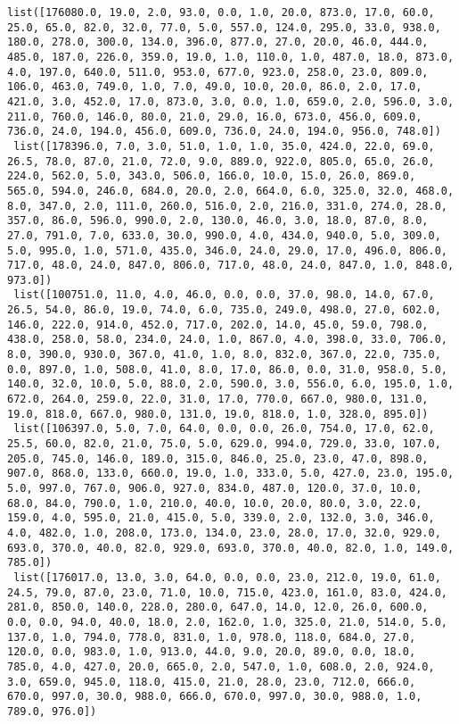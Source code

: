 \documentclass[11pt]{article}
\begin{document}
\begin{Verbatim}[commandchars=\\\{\}]
 list([176080.0, 19.0, 2.0, 93.0, 0.0, 1.0, 20.0, 873.0, 17.0, 60.0, 25.0, 65.0, 82.0, 32.0, 77.0, 5.0, 557.0, 124.0, 295.0, 33.0, 938.0, 180.0, 278.0, 300.0, 134.0, 396.0, 877.0, 27.0, 20.0, 46.0, 444.0, 485.0, 187.0, 226.0, 359.0, 19.0, 1.0, 110.0, 1.0, 487.0, 18.0, 873.0, 4.0, 197.0, 640.0, 511.0, 953.0, 677.0, 923.0, 258.0, 23.0, 809.0, 106.0, 463.0, 749.0, 1.0, 7.0, 49.0, 10.0, 20.0, 86.0, 2.0, 17.0, 421.0, 3.0, 452.0, 17.0, 873.0, 3.0, 0.0, 1.0, 659.0, 2.0, 596.0, 3.0, 211.0, 760.0, 146.0, 80.0, 21.0, 29.0, 16.0, 673.0, 456.0, 609.0, 736.0, 24.0, 194.0, 456.0, 609.0, 736.0, 24.0, 194.0, 956.0, 748.0])
 list([178396.0, 7.0, 3.0, 51.0, 1.0, 1.0, 35.0, 424.0, 22.0, 69.0, 26.5, 78.0, 87.0, 21.0, 72.0, 9.0, 889.0, 922.0, 805.0, 65.0, 26.0, 224.0, 562.0, 5.0, 343.0, 506.0, 166.0, 10.0, 15.0, 26.0, 869.0, 565.0, 594.0, 246.0, 684.0, 20.0, 2.0, 664.0, 6.0, 325.0, 32.0, 468.0, 8.0, 347.0, 2.0, 111.0, 260.0, 516.0, 2.0, 216.0, 331.0, 274.0, 28.0, 357.0, 86.0, 596.0, 990.0, 2.0, 130.0, 46.0, 3.0, 18.0, 87.0, 8.0, 27.0, 791.0, 7.0, 633.0, 30.0, 990.0, 4.0, 434.0, 940.0, 5.0, 309.0, 5.0, 995.0, 1.0, 571.0, 435.0, 346.0, 24.0, 29.0, 17.0, 496.0, 806.0, 717.0, 48.0, 24.0, 847.0, 806.0, 717.0, 48.0, 24.0, 847.0, 1.0, 848.0, 973.0])
 list([100751.0, 11.0, 4.0, 46.0, 0.0, 0.0, 37.0, 98.0, 14.0, 67.0, 26.5, 54.0, 86.0, 19.0, 74.0, 6.0, 735.0, 249.0, 498.0, 27.0, 602.0, 146.0, 222.0, 914.0, 452.0, 717.0, 202.0, 14.0, 45.0, 59.0, 798.0, 438.0, 258.0, 58.0, 234.0, 24.0, 1.0, 867.0, 4.0, 398.0, 33.0, 706.0, 8.0, 390.0, 930.0, 367.0, 41.0, 1.0, 8.0, 832.0, 367.0, 22.0, 735.0, 0.0, 897.0, 1.0, 508.0, 41.0, 8.0, 17.0, 86.0, 0.0, 31.0, 958.0, 5.0, 140.0, 32.0, 10.0, 5.0, 88.0, 2.0, 590.0, 3.0, 556.0, 6.0, 195.0, 1.0, 672.0, 264.0, 259.0, 22.0, 31.0, 17.0, 770.0, 667.0, 980.0, 131.0, 19.0, 818.0, 667.0, 980.0, 131.0, 19.0, 818.0, 1.0, 328.0, 895.0])
 list([106397.0, 5.0, 7.0, 64.0, 0.0, 0.0, 26.0, 754.0, 17.0, 62.0, 25.5, 60.0, 82.0, 21.0, 75.0, 5.0, 629.0, 994.0, 729.0, 33.0, 107.0, 205.0, 745.0, 146.0, 189.0, 315.0, 846.0, 25.0, 23.0, 47.0, 898.0, 907.0, 868.0, 133.0, 660.0, 19.0, 1.0, 333.0, 5.0, 427.0, 23.0, 195.0, 5.0, 997.0, 767.0, 906.0, 927.0, 834.0, 487.0, 120.0, 37.0, 10.0, 68.0, 84.0, 790.0, 1.0, 210.0, 40.0, 10.0, 20.0, 80.0, 3.0, 22.0, 159.0, 4.0, 595.0, 21.0, 415.0, 5.0, 339.0, 2.0, 132.0, 3.0, 346.0, 4.0, 482.0, 1.0, 208.0, 173.0, 134.0, 23.0, 28.0, 17.0, 32.0, 929.0, 693.0, 370.0, 40.0, 82.0, 929.0, 693.0, 370.0, 40.0, 82.0, 1.0, 149.0, 785.0])
 list([176017.0, 13.0, 3.0, 64.0, 0.0, 0.0, 23.0, 212.0, 19.0, 61.0, 24.5, 79.0, 87.0, 23.0, 71.0, 10.0, 715.0, 423.0, 161.0, 83.0, 424.0, 281.0, 850.0, 140.0, 228.0, 280.0, 647.0, 14.0, 12.0, 26.0, 600.0, 0.0, 0.0, 94.0, 40.0, 18.0, 2.0, 162.0, 1.0, 325.0, 21.0, 514.0, 5.0, 137.0, 1.0, 794.0, 778.0, 831.0, 1.0, 978.0, 118.0, 684.0, 27.0, 120.0, 0.0, 983.0, 1.0, 913.0, 44.0, 9.0, 20.0, 89.0, 0.0, 18.0, 785.0, 4.0, 427.0, 20.0, 665.0, 2.0, 547.0, 1.0, 608.0, 2.0, 924.0, 3.0, 659.0, 945.0, 118.0, 415.0, 21.0, 28.0, 23.0, 712.0, 666.0, 670.0, 997.0, 30.0, 988.0, 666.0, 670.0, 997.0, 30.0, 988.0, 1.0, 789.0, 976.0])

\end{Verbatim}
\end{document}
